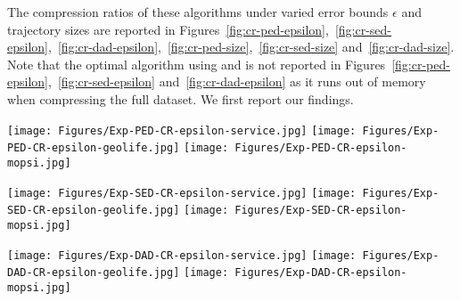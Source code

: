 The compression ratios of these algorithms under varied error bounds $\epsilon$ and trajectory sizes are reported in Figures~\ref{fig:cr-ped-epsilon},~\ref{fig:cr-sed-epsilon},~\ref{fig:cr-dad-epsilon},~\ref{fig:cr-ped-size},~\ref{fig:cr-sed-size} and~\ref{fig:cr-dad-size}.
{Note that the optimal algorithm using \sed and \dad is not reported in Figures~\ref{fig:cr-ped-epsilon},~\ref{fig:cr-sed-epsilon} and~\ref{fig:cr-dad-epsilon} as it runs out of memory when compressing the full dataset}. We first report our findings.

\begin{figure*}[tb!]
	\centering
	\texttt{[image: Figures/Exp-PED-CR-epsilon-service.jpg]} 	\hspace{0.5ex}
	\texttt{[image: Figures/Exp-PED-CR-epsilon-geolife.jpg]}	\hspace{0.5ex}
	\texttt{[image: Figures/Exp-PED-CR-epsilon-mopsi.jpg]}		
	\vspace{-2ex}
	\caption{\small Evaluation of compression ratios (\ped) on full datasets: varying the error bound $\epsilon$.}
	\label{fig:cr-ped-epsilon}
	\vspace{-2ex}
\end{figure*}
\begin{figure*}[tb!]
	\centering
	\texttt{[image: Figures/Exp-SED-CR-epsilon-service.jpg]} 	\hspace{0.5ex}
	\texttt{[image: Figures/Exp-SED-CR-epsilon-geolife.jpg]}	\hspace{0.5ex}
	\texttt{[image: Figures/Exp-SED-CR-epsilon-mopsi.jpg]}		
	\vspace{-2ex}
	\caption{\small Evaluation of compression ratios (\sed) on full datasets: varying the error bound $\epsilon$.}
	\label{fig:cr-sed-epsilon}
	\vspace{-2ex}
\end{figure*}
\begin{figure*}[tb!]
	\centering
	\texttt{[image: Figures/Exp-DAD-CR-epsilon-service.jpg]} 	\hspace{0.5ex}
	\texttt{[image: Figures/Exp-DAD-CR-epsilon-geolife.jpg]}	\hspace{0.5ex}
	\texttt{[image: Figures/Exp-DAD-CR-epsilon-mopsi.jpg]}		
	\vspace{-2ex}
	\caption{\small Evaluation of compression ratios (\dad) on full datasets: varying the error bound $\epsilon$.}
	\label{fig:cr-dad-epsilon}
	\vspace{-2ex}
\end{figure*}


